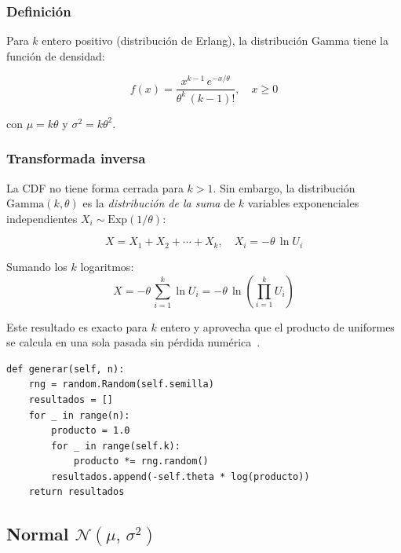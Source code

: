 \documentclass[a4paper, 11pt]{article}
\begin{document}
\subsubsection*{Definición}

Para $k$ entero positivo (distribución de Erlang), la distribución Gamma tiene la
función de densidad:

\begin{equation}
  f(x) = \frac{x^{k-1}\,e^{-x/\theta}}{\theta^k\,(k-1)!}, \quad x \geq 0
  \label{eq:gamma_pdf}
\end{equation}

con $\mu = k\theta$ y $\sigma^2 = k\theta^2$.

\subsubsection*{Transformada inversa}

La CDF no tiene forma cerrada para $k > 1$. Sin embargo, la distribución
$\mathrm{Gamma}(k, \theta)$ es la \emph{distribución de la suma} de $k$ variables
exponenciales independientes $X_i \sim \mathrm{Exp}(1/\theta)$:

\begin{equation}
  X = X_1 + X_2 + \cdots + X_k, \quad X_i = -\theta\,\ln U_i
\end{equation}

Sumando los $k$ logaritmos:
\begin{equation}
  X = -\theta\,\sum_{i=1}^{k}\ln U_i
    = -\theta\,\ln\!\left(\prod_{i=1}^{k} U_i\right)
  \label{eq:gamma_inv}
\end{equation}

Este resultado es exacto para $k$ entero y aprovecha que el producto de uniformes
se calcula en una sola pasada sin pérdida numérica~\cite{naylor1982tecnicas}.

\begin{lstlisting}[style=python, caption={Generador Gamma/Erlang — transformada inversa.}]
def generar(self, n):
    rng = random.Random(self.semilla)
    resultados = []
    for _ in range(n):
        producto = 1.0
        for _ in range(self.k):
            producto *= rng.random()
        resultados.append(-self.theta * log(producto))
    return resultados
\end{lstlisting}


\subsection{Normal \texorpdfstring{$\mathcal{N}(\mu,\,\sigma^2)$}{N(mu,sigma²)}}
\end{document}
